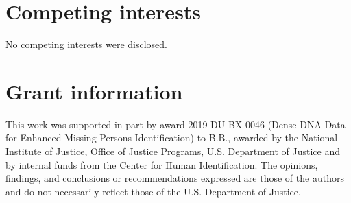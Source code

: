 \documentclass[9pt,a4paper,]{extarticle}
\begin{document}
\hypertarget{competing-interests}{%
\section{Competing interests}\label{competing-interests}}

No competing interests were disclosed.

\hypertarget{grant-information}{%
\section{Grant information}\label{grant-information}}

This work was supported in part by award 2019-DU-BX-0046 (Dense DNA Data for Enhanced Missing Persons Identification) to B.B., awarded by the National Institute of Justice, Office of Justice Programs, U.S. Department of Justice and by internal funds from the Center for Human Identification. The opinions, findings, and conclusions or recommendations expressed are those of the authors and do not necessarily reflect those of the U.S. Department of Justice.

{\small}
\end{document}
